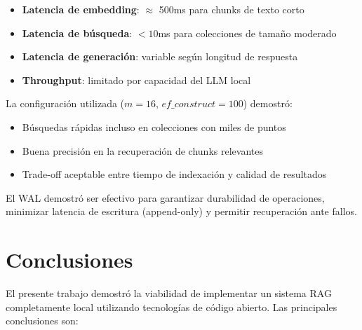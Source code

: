\documentclass[conference]{IEEEtran}
\begin{document}
\begin{itemize}
    \item \textbf{Latencia de embedding}: $\approx$ 500ms para chunks de texto corto
    \item \textbf{Latencia de búsqueda}: $< 10$ms para colecciones de tamaño moderado
    \item \textbf{Latencia de generación}: variable según longitud de respuesta
    \item \textbf{Throughput}: limitado por capacidad del LLM local
\end{itemize}

La configuración utilizada ($m=16$, $ef\_construct=100$) demostró:

\begin{itemize}
    \item Búsquedas rápidas incluso en colecciones con miles de puntos
    \item Buena precisión en la recuperación de chunks relevantes
    \item Trade-off aceptable entre tiempo de indexación y calidad de resultados
\end{itemize}

El WAL demostró ser efectivo para garantizar durabilidad de operaciones, minimizar latencia de escritura (append-only) y permitir recuperación ante fallos.

\section{Conclusiones}
\label{sec:conclusiones}

El presente trabajo demostró la viabilidad de implementar un sistema RAG completamente local utilizando tecnologías de código abierto. Las principales conclusiones son:
\end{document}
